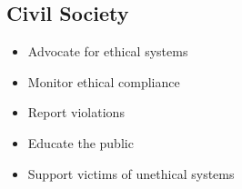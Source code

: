 \subsection{Civil Society}

\begin{itemize}
    \item Advocate for ethical systems
    \item Monitor ethical compliance
    \item Report violations
    \item Educate the public
    \item Support victims of unethical systems
\end{itemize}

\cleardoublepage
